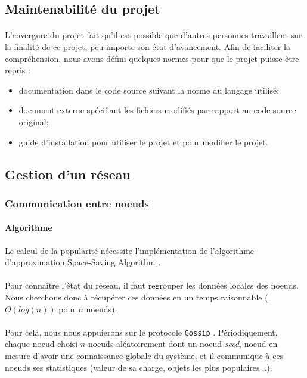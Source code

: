 \documentclass[12pt]{article}
\begin{document}
\subsection{Maintenabilité du projet}

\paragraph{} L'envergure du projet fait qu'il est possible que d'autres personnes travaillent sur la finalité de ce projet, peu importe son état d'avancement.
Afin de faciliter la compréhension, nous avons défini quelques normes pour que le projet puisse être repris :
\begin{itemize}
	\item documentation dans le code source suivant la norme du langage utilisé;
	\item document externe spécifiant les fichiers modifiés par rapport au code source original;
	\item guide d'installation pour utiliser le projet et pour modifier le projet.
\end{itemize}

\subsection{Gestion d'un réseau}

\subsubsection{Communication entre noeuds}

\paragraph{Algorithme} Le calcul de la popularité nécessite l'implémentation de l'algorithme d'approximation Space-Saving Algorithm \cite{SpaceSaving}.

\paragraph{}Pour connaître l'état du réseau, il faut regrouper les données locales des noeuds.
Nous cherchons donc à récupérer ces données en un temps raisonnable ($O(log(n))$ pour $n$ noeuds).

\paragraph{}Pour cela, nous nous appuierons sur le protocole \texttt{Gossip} \cite{gossip}.
Périodiquement, chaque noeud choisi $n$ noeuds aléatoirement dont un noeud \textit{seed}\cite{seed}, noeud en mesure d'avoir une connaissance globale du système, et il communique à ces noeuds ses statistiques (valeur de sa charge, objets les plus populaires...).
\end{document}
